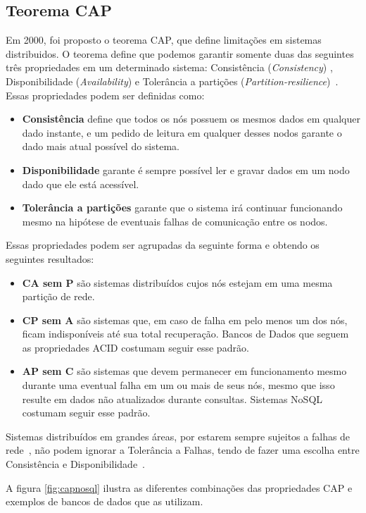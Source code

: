 \subsection{Teorema CAP}
	Em 2000, foi proposto o teorema CAP, que define limitações em sistemas distribuidos. O teorema define que podemos garantir somente duas das seguintes três propriedades em um determinado sistema: Consistência (\emph{Consistency}) , Disponibilidade (\emph{Availability}) e Tolerância a partições (\emph{Partition-resilience})~\cite{brewer}. Essas propriedades podem ser definidas como:
    \begin{itemize}
	\item \textbf{Consistência} define que todos os nós possuem os mesmos dados em qualquer dado instante, e um pedido de leitura em qualquer desses nodos garante o dado mais atual possível do sistema.
    \item \textbf{Disponibilidade} garante é sempre possível ler e gravar dados em um nodo dado que ele está acessível. 
    \item \textbf{Tolerância a partições} garante que o sistema irá continuar funcionando mesmo na hipótese de eventuais falhas de comunicação entre os nodos.
	\end{itemize}
	
    Essas propriedades podem ser agrupadas da seguinte forma e obtendo os seguintes resultados:
    \begin{itemize}
    \item \textbf{CA sem P} são sistemas distribuídos cujos nós estejam em uma mesma partição de rede.
    \item \textbf{CP sem A} são sistemas que, em caso de falha em pelo menos um dos nós, ficam indisponíveis até sua total recuperação. Bancos de Dados que seguem as propriedades ACID costumam seguir esse padrão.
    \item \textbf{AP sem C} são sistemas que devem permanecer em funcionamento mesmo durante uma eventual falha em um ou mais de seus nós, mesmo que isso resulte em dados não atualizados durante consultas. Sistemas NoSQL costumam seguir esse padrão.  
	\end{itemize}
    
    Sistemas distribuídos em grandes áreas, por estarem sempre sujeitos a falhas de rede~\cite{deutsch}, não podem ignorar a Tolerância a Falhas, tendo de fazer uma escolha entre Consistência e Disponibilidade~\cite{brewer12years}.
    
    A figura \ref{fig:capnosql} ilustra as diferentes combinações das propriedades CAP e exemplos de bancos de dados que as utilizam.
    

